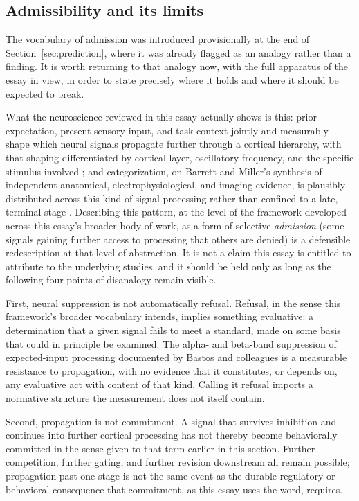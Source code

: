 \documentclass[11pt]{article}
\begin{document}
\subsection{Admissibility and its limits}

The vocabulary of admission was introduced provisionally at the end of Section~\ref{sec:prediction}, where it was already flagged as an analogy rather than a finding. It is worth returning to that analogy now, with the full apparatus of the essay in view, in order to state precisely where it holds and where it should be expected to break.

What the neuroscience reviewed in this essay actually shows is this: prior expectation, present sensory input, and task context jointly and measurably shape which neural signals propagate further through a cortical hierarchy, with that shaping differentiated by cortical layer, oscillatory frequency, and the specific stimulus involved \citep{Bastos2020}; and categorization, on Barrett and Miller's synthesis of independent anatomical, electrophysiological, and imaging evidence, is plausibly distributed across this kind of signal processing rather than confined to a late, terminal stage \citep{BarrettMiller2026}. Describing this pattern, at the level of the framework developed across this essay's broader body of work, as a form of selective \emph{admission} (some signals gaining further access to processing that others are denied) is a defensible redescription at that level of abstraction. It is not a claim this essay is entitled to attribute to the underlying studies, and it should be held only as long as the following four points of disanalogy remain visible.

First, neural suppression is not automatically refusal. Refusal, in the sense this framework's broader vocabulary intends, implies something evaluative: a determination that a given signal fails to meet a standard, made on some basis that could in principle be examined. The alpha- and beta-band suppression of expected-input processing documented by Bastos and colleagues is a measurable resistance to propagation, with no evidence that it constitutes, or depends on, any evaluative act with content of that kind. Calling it refusal imports a normative structure the measurement does not itself contain.

Second, propagation is not commitment. A signal that survives inhibition and continues into further cortical processing has not thereby become behaviorally committed in the sense given to that term earlier in this section. Further competition, further gating, and further revision downstream all remain possible; propagation past one stage is not the same event as the durable regulatory or behavioral consequence that commitment, as this essay uses the word, requires.
\end{document}
